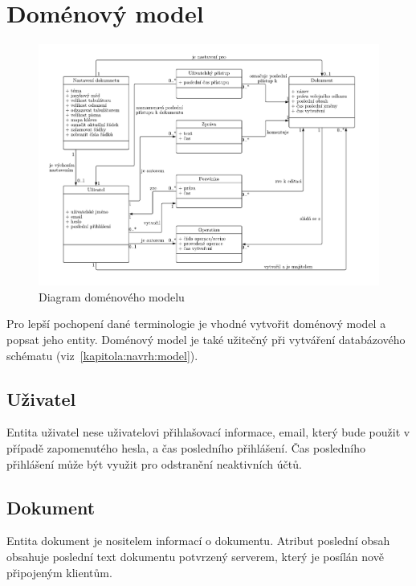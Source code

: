 \section{Doménový model}\label{sec:domenovyModel}

\begin{figure}[ht]
    \centering
    \includegraphics[width=\textwidth]{partials/analyza/domenovy_model.pdf}
    \caption{Diagram doménového modelu}\label{fig:domenovy_model}
\end{figure}

Pro lepší pochopení dané terminologie je vhodné vytvořit doménový model a popsat jeho entity.
Doménový model je také užitečný při vytváření databázového schématu (viz~\ref{kapitola:navrh:model}).

\subsection{Uživatel}\label{subsec:uživatel}

Entita uživatel nese uživatelovi přihlašovací informace, email, který bude použit v případě zapomenutého hesla, a čas posledního přihlášení.
Čas posledního přihlášení může být využit pro odstranění neaktivních účtů.

\subsection{Dokument}\label{subsec:dokument}

Entita dokument je nositelem informací o dokumentu.
Atribut poslední obsah obsahuje poslední text dokumentu potvrzený serverem, který je posílán nově připojeným klientům.

